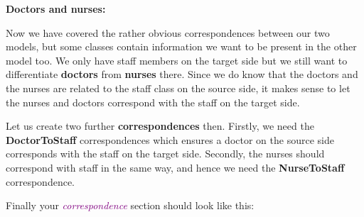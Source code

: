 \textbf{Doctors and nurses:}

Now we have covered the rather obvious correspondences between our two models, but some classes contain information we want to be present in the other model too. We only have staff members on the target side but we still want to differentiate \textbf{doctors} from \textbf{nurses} there. Since we do know that the doctors and the nurses are related to the staff class on the source side, it makes sense to let the nurses and doctors correspond with the staff on the target side.

Let us create two further \textbf{correspondences} then. Firstly, we need the \textbf{DoctorToStaff} correspondences which ensures a doctor on the source side corresponds with the staff on the target side. Secondly, the nurses should correspond with staff in the same way, and hence we need the \textbf{NurseToStaff} correspondence.\newline

Finally your \textcolor{Purple}{\textit{correspondence}} section should look like this:\newline

